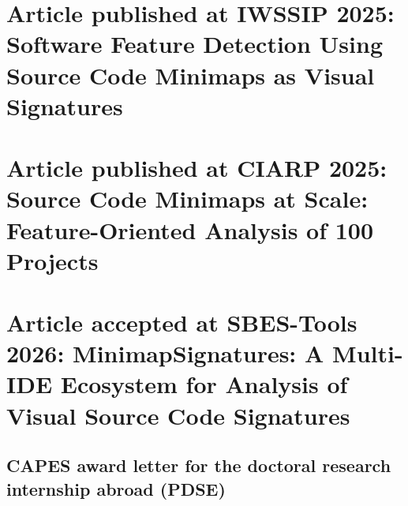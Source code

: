 \documentclass[qualificacao,doutorado]{packages/icmc}
\begin{document}


\begin{apendicesenv}
\partapendices

\chapter{Article published at IWSSIP 2025: Software Feature Detection Using Source Code Minimaps as Visual Signatures}
\label{apendice:iwssip}


\chapter{Article published at CIARP 2025: Source Code Minimaps at Scale: Feature-Oriented Analysis of 100 Projects}
\label{apendice:ciarp}


\chapter{Article accepted at SBES-Tools 2026: MinimapSignatures: A Multi-IDE Ecosystem for Analysis of Visual Source Code Signatures}
\label{apendice:sbes}


\end{apendicesenv}

\begin{anexosenv}
\partanexos

\chapter{CAPES award letter for the doctoral research internship abroad (PDSE)}
\label{anexo:pdse}


\end{anexosenv}
\end{document}
